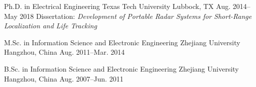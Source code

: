 
\begin{cventries}

    \cventry
        {Ph.D. in Electrical Engineering}
        {Texas Tech University}
        {Lubbock, TX}
        {Aug. 2014--May 2018}
        {
            {\cvdescfont Dissertation: \emph{Development of Portable Radar Systems for Short-Range Localization and Life Tracking}}
        }

    \cventry
        {M.Sc. in Information Science and Electronic Engineering}
        {Zhejiang University}
        {Hangzhou, China}
        {Aug. 2011--Mar. 2014}
        {}

    \cventry
        {B.Sc. in Information Science and Electronic Engineering}
        {Zhejiang University}
        {Hangzhou, China}
        {Aug. 2007--Jun. 2011}
        {}

\end{cventries}
